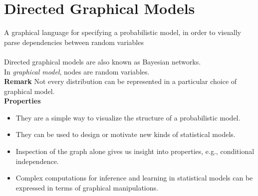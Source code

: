 \section{Directed Graphical Models}

A graphical language for specifying a probabilistic model, in order to visually parse dependencies between random variables\\ \\
Directed graphical models are also known as Bayesian networks. \\ 
In \textit{graphical model}, nodes are random variables. \\
\textbf{Remark} Not every distribution can be represented in a particular choice of graphical model. \\
\textbf{Properties}
\begin{itemize}
	\item They are a simple way to visualize the structure of a probabilistic model.
	\item They can be used to design or motivate new kinds of statistical models.
	\item Inspection of the graph alone gives us insight into properties, e.g., conditional independence.
	\item Complex computations for inference and learning in statistical models can be expressed in terms of graphical manipulations.
\end{itemize}
